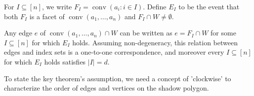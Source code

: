 \documentclass{article}\usepackage[a4paper,margin=20mm]{geometry}
\newcommand{\R}{\mathbb R}
\newcommand{\conv}{\operatorname{conv}}
\renewcommand{\subset}{\subseteq}
\begin{document}
\begin{definition}\label{def:edge-event}
    For $I \subset [n]$, we write $F_I = \conv(a_i : i \in I)$.
    Define $E_I$ to be the event that both
    $F_I$ is a facet of $\conv(a_1,\dots,a_n)$
    and $F_I \cap W \neq \emptyset$.
\end{definition}

\begin{remark}\label{fact:edgecounting}
    Any edge $e$ of $\conv(a_1,\dots,a_n) \cap W$ can be written as $e = F_I \cap W$
    for some $I \subset [n]$ for which $E_I$ holds.
    Assuming non-degeneracy, this relation between edges and index sets
    is a one-to-one correspondence, and moreover every $I \subset [n]$
    for which $E_I$ holds satisfies $|I|=d$.
\end{remark}

To state the key theorem's assumption, we need a concept of 'clockwise' to characterize the order of edges and vertices on the shadow polygon.
\end{document}

